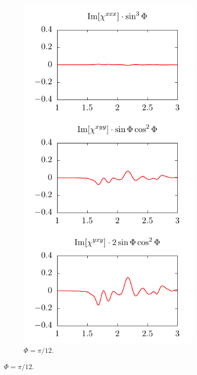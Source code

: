 \documentclass[aps,prb,10pt,letterpaper,notitlepage]{revtex4-1}
\begin{document}
\begin{figure}[t]
    \centering
    \begin{subfigure}[b]{0.3\textwidth}
        \includegraphics[width=\textwidth]{rot/comps15.pdf}
        \caption{$\Phi = \pi/12$.}
    \end{subfigure}

\end{figure}
\end{document}

